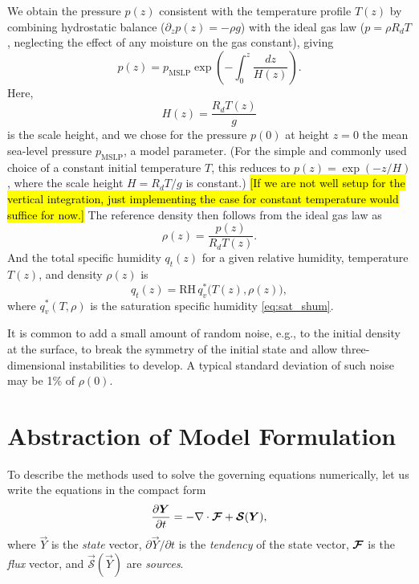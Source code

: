 \documentclass{article}
\begin{document}
{We obtain the pressure $p(z)$ consistent with the temperature profile $T(z)$ by combining hydrostatic balance ($\partial_z p(z) = - \rho g$) with the ideal gas law ($p=\rho R_d T$, neglecting the effect of any moisture on the gas constant), giving
\begin{equation}
p(z) = p_{\mathrm{MSLP}} \exp\left(-\int_0^z \frac{dz}{H(z)} \right).
\end{equation}
Here,
\begin{equation}
H(z)  = \frac{R_d T(z)}{g}
\end{equation}
is the scale height, and we chose for the pressure $p(0)$ at height $z=0$ the mean sea-level pressure $p_{\mathrm{MSLP}}$, a model parameter. (For the simple and commonly used choice of a constant initial temperature $T$, this reduces to $p(z) = \exp (-z/H)$, where the scale height $H = R_d T/g$ is constant.) \hl{[If we are not well setup for the vertical integration, just implementing the case for constant temperature would suffice for now.]} The reference density then follows from the ideal gas law as
\begin{equation}
    \rho(z) = \frac{p(z)}{R_d T(z)}.
\end{equation}
And the total specific humidity $q_t(z)$ for a given relative humidity, temperature $T(z)$, and density $\rho(z)$ is
\begin{equation}
    q_t(z) = \mathrm{RH} \, q_v^*\bigl( T(z), \rho(z) \bigr),
\end{equation}
where $q_v^*(T, \rho)$ is the saturation specific humidity \eqref{eq:sat_shum}.

It is common to add a small amount of random noise, e.g., to the initial density at the surface, to break the symmetry of the initial state and allow three-dimensional instabilities to develop. A typical standard deviation of such noise may be 1\% of $\rho(0)$.

\section{Abstraction of Model Formulation}\label{s:abstract_model_formulation}

To describe the methods used to solve the governing equations numerically, let us write the equations in the compact form 
\begin{equation}\label{e:eom_compact}
\frac{\partial \boldsymbol{{Y}}}{\partial t}  =  - \nabla \cdot \boldsymbol{{\mathcal{F}}} + \boldsymbol{{\mathcal{S}}}(\boldsymbol{{Y}}),
\end{equation}
where $\vec{Y}$ is the \emph{state} vector, $\partial\vec{Y}/\partial t$ is the \emph{tendency} of the state vector, $\boldsymbol{{\mathcal{F}}}$ is the \emph{flux} vector, and $\vec{\mathcal{S}}(\vec{Y})$ are \emph{sources}. 

}
\end{document}
